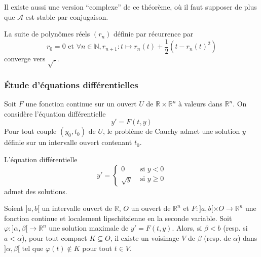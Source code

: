 	\begin{remark}
		Il existe aussi une version ``complexe'' de ce théorème, où il faut supposer de plus que $\mathcal{A}$ est stable par conjugaison.
	\end{remark}

	\begin{example}
		La suite de polynômes réels $(r_n)$ définie par récurrence par
		\[ r_0 = 0 \text{ et } \forall n \in \mathbb{N}, r_{n+1} : t \mapsto r_n(t) + \frac{1}{2} (t - r_n(t)^2) \]
		converge vers $\sqrt{.}$.
	\end{example}

	\subsubsection{Étude d'équations différentielles}


	\begin{theorem}
		Soit $F$ une fonction continue sur un ouvert $U$ de $\mathbb{R} \times \mathbb{R}^n$ à valeurs dans $\mathbb{R}^n$. On considère l'équation différentielle
		\[ y' = F(t,y) \]
		Pour tout couple $(y_0, t_0)$ de $U$, le problème de Cauchy admet une solution $y$ définie sur un intervalle ouvert contenant $t_0$.
	\end{theorem}

	\begin{example}
		L'équation différentielle
		\[
		y' =
		\begin{cases}
			0 &\text{ si } y < 0 \\
			\sqrt{y} &\text{ si } y \geq 0
		\end{cases}
		\]
		admet des solutions.
	\end{example}


	\begin{theorem}
		Soient $]a,b[$ un intervalle ouvert de $\mathbb{R}$, $O$ un ouvert de $\mathbb{R}^n$ et $F : ]a,b[ \times O \rightarrow \mathbb{R}^n$ une fonction continue et localement lipschitzienne en la seconde variable. Soit $\varphi : ]\alpha,\beta[ \rightarrow \mathbb{R}^n$ une solution maximale de $y' = F(t,y)$.
		\newpar
		Alors, si $\beta < b$ (resp. si $a < \alpha$), pour tout compact $K \subseteq O$, il existe un voisinage $V$ de $\beta$ (resp. de $\alpha$) dans $]\alpha,\beta[$ tel que $\varphi(t) \notin K$ pour tout $t \in V$.
	\end{theorem}

